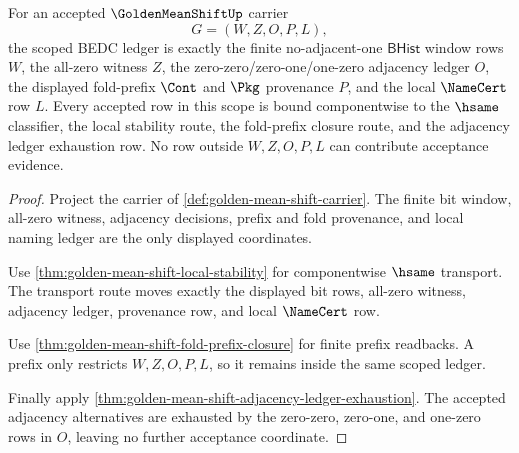 \begin{theorem}
\label{thm:golden-mean-shift-scoped-ledger-binding}
For an accepted $\GoldenMeanShiftUp$ carrier
$$
G=(W,Z,O,P,L),
$$
the scoped BEDC ledger is exactly the finite no-adjacent-one $\mathsf{BHist}$ window rows $W$, the all-zero witness $Z$, the zero-zero/zero-one/one-zero adjacency ledger $O$, the displayed fold-prefix $\Cont$ and $\Pkg$ provenance $P$, and the local $\NameCert$ row $L$. Every accepted row in this scope is bound componentwise to the $\hsame$ classifier, the local stability route, the fold-prefix closure route, and the adjacency ledger exhaustion row. No row outside $W,Z,O,P,L$ can contribute acceptance evidence.
\end{theorem}
\begin{proof}
Project the carrier of \autoref{def:golden-mean-shift-carrier}. The finite bit window, all-zero witness, adjacency decisions, prefix and fold provenance, and local naming ledger are the only displayed coordinates.

Use \autoref{thm:golden-mean-shift-local-stability} for componentwise $\hsame$ transport. The transport route moves exactly the displayed bit rows, all-zero witness, adjacency ledger, provenance row, and local $\NameCert$ row.

Use \autoref{thm:golden-mean-shift-fold-prefix-closure} for finite prefix readbacks. A prefix only restricts $W,Z,O,P,L$, so it remains inside the same scoped ledger.

Finally apply \autoref{thm:golden-mean-shift-adjacency-ledger-exhaustion}. The accepted adjacency alternatives are exhausted by the zero-zero, zero-one, and one-zero rows in $O$, leaving no further acceptance coordinate.
\end{proof}

